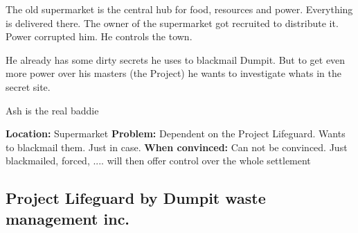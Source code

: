 \begin{npcBox}[title=Ash continued]
    
    \begin{stressSection}
    \end{stressSection}
    \begin{tabularx}{\textwidth}{ XX }
    \end{tabularx}
    
    \begin{consequences}
    \item {}
    \item {}
    \item {}
    \end{consequences}
    
    \begin{npcDescription}
    The old supermarket is the central hub for food, resources and power. Everything is delivered there. The owner of the supermarket got recruited to distribute it. Power corrupted him. He controls the town.

    He already has some dirty secrets he uses to blackmail Dumpit. But to get even more power over his masters (the Project) he wants to investigate whats in the secret site.
    
    Ash is the real baddie

    \textbf{Location:} Supermarket
    \textbf{Problem:} Dependent on the Project Lifeguard. Wants to blackmail them. Just in case.
    \textbf{When convinced:} Can not be convinced. Just blackmailed, forced, .... will then offer control over the whole settlement
    \end{npcDescription}
    
\end{npcBox}




\subsection{Project Lifeguard by Dumpit waste management inc.}


